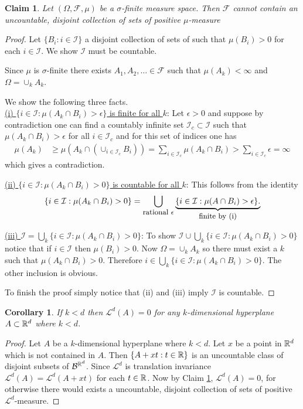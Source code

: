 \documentclass[10pt,letterpaper,twocolumn]{article}
\newtheorem{corollary}{Corollary}
\newtheorem{claim}{Claim}
\begin{document}
\begin{claim}
\label{cc}
Let $(\Omega, \mathcal F,\mu)$ be a $\sigma$-finite measure space. Then $\mathcal F$ cannot contain an uncountable, disjoint collection of sets of positive $\mu$-measure
\end{claim}
\begin{proof}
Let $\{B_i: i\in \mathcal I\}$ a disjoint collection of sets of such that $\mu(B_i)>0$ for each $i\in\mathcal I$. 
We show $\mathcal I$ must be countable.


Since $\mu$ is $\sigma$-finite there exists $A_1,A_2,\ldots \in\mathcal F$ such that $\mu(A_k)<\infty$ and $\Omega = \cup_k A_k$. 

We show the following three facts.\\
\noindent
\underline{(i) $\{ i\in \mathcal I: \mu(A_k\cap B_i)>\epsilon\}$ is finite for all $k$}:
Let $\epsilon>0$ and suppose by contradiction one can find a countably infinite set  $\mathcal I_c\subset \mathcal I$ such that $\mu(A_k\cap B_i)>\epsilon $ for all $i\in \mathcal I_c$ and for this set of indices one has 
\begin{align*}
\mu(A_k)&\geq \mu(A_k\cap (\cup_{i\in\mathcal I_c}B_i ))= \sum_{i\in\mathcal I_c}\mu(A_k\cap B_i) > \sum_{i\in\mathcal I_c}\epsilon =\infty
\end{align*}
which gives a contradiction. 


  \vspace{.2cm}
\noindent
\underline{(ii) $\{ i\in \mathcal I: \mu(A_k\cap B_i)>0\}$ is countable for all $k$}:
This follows from the  identity
\[\{ i\in \mathcal I: \mu(A_k\cap B_i)>0\}=\bigcup_\text{\small rational 
$\epsilon$} \underbrace{\{ i\in \mathcal I: \mu(A\cap B_i)>\epsilon\}.} _\text{\small finite by (i)}   \]


 \vspace{.2cm}
\noindent
\underline{(iii) $\mathcal I = \bigcup_k \{ i\in \mathcal I: \mu(A_k\cap B_i)>0\}$}:
 To show $\mathcal I \cup \bigcup_k \{ i\in \mathcal I: \mu(A_k\cap B_i)>0\}$ notice that  if $i\in\mathcal I$ then $\mu(B_i)>0$. Now  $\Omega =\cup_k A_k$ so there must exist a $k$ such that $\mu(A_k\cap B_i)>0$.  Therefore $i\in  \bigcup_k \{ i\in \mathcal I: \mu(A_k\cap B_i)>0\}$. The other inclusion is obvious.
 
 To finish the proof simply notice that (ii) and (iii) imply $\mathcal I$ is countable. 
\end{proof}

\begin{corollary}If $k<d$ then
$\mathcal L^d(A)=0$ for any $k$-dimensional hyperplane $A\subset \Bbb R^d$ where $k<d$.
\end{corollary}
\begin{proof} 
Let $A$ be a $k$-dimensional hyperplane where $k<d$. Let $x$ be a point in $\Bbb R^d$ which is not  contained in $A$.
Then $\{A+xt: t\in\Bbb R\}$ is an uncountable class of disjoint subsets of $\mathcal B^{\Bbb R^d}$. Since $\mathcal L^d$ is translation invariance $\mathcal L^d(A) = \mathcal L^d(A+xt)$ for each $t\in\Bbb R$. Now by Claim \ref{cc}, $\mathcal L^d(A)=0$, for otherwise there would exists a uncountable, disjoint collection of sets of positive $\mathcal L^d$-measure.
\end{proof}
\end{document}
